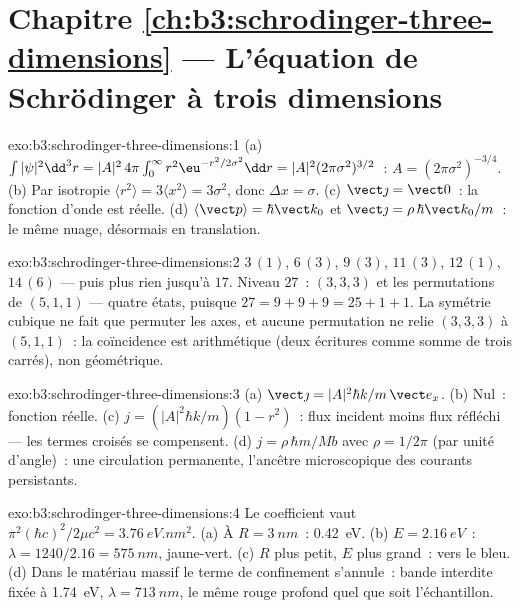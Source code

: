 \section*{Chapitre \ref{ch:b3:schrodinger-three-dimensions} --- L'équation de Schrödinger à trois dimensions}

\begin{solution}{exo:b3:schrodinger-three-dimensions:1}
(a) $\int|\psi|^2\dd^3r = |A|^2\,4\pi\int_0^\infty r^2\eu^{-r^2/2
\sigma^2}\dd r = |A|^2(2\pi\sigma^2)^{3/2}$~: $A = (2\pi\sigma^2)^{
-3/4}$. (b) Par isotropie $\langle r^2\rangle = 3\langle x^2\rangle =
3\sigma^2$, donc $\Delta x = \sigma$. (c) $\vect\jmath = \vect 0$~: la
fonction d'onde est réelle. (d) $\langle\vect p\rangle = \hbar\vect k_0$
et $\vect\jmath = \rho\,\hbar\vect k_0/m$~: le même nuage, désormais en
translation.
\end{solution}

\begin{solution}{exo:b3:schrodinger-three-dimensions:2}
$3\,(1)$, $6\,(3)$, $9\,(3)$, $11\,(3)$, $12\,(1)$, $14\,(6)$ ---
puis plus rien jusqu'à $17$. Niveau $27$~: $(3,3,3)$ et les
permutations de $(5,1,1)$ --- quatre états, puisque $27 = 9+9+9 = 25+1+1$.
La symétrie cubique ne fait que permuter les axes, et aucune
permutation ne relie $(3,3,3)$ à $(5,1,1)$~: la coïncidence est
arithmétique (deux écritures comme somme de trois carrés), non
géométrique.
\end{solution}

\begin{solution}{exo:b3:schrodinger-three-dimensions:3}
(a) $\vect\jmath = |A|^2\hbar k/m\,\vect e_x$. (b) Nul~: fonction
réelle. (c) $j = (|A|^2\hbar k/m)(1 - r^2)$~: flux incident moins flux
réfléchi --- les termes croisés se compensent. (d) $j = \rho\,\hbar
m/Mb$ avec $\rho = 1/2\pi$ (par unité d'angle)~: une circulation
permanente, l'ancêtre microscopique des courants persistants.
\end{solution}

\begin{solution}{exo:b3:schrodinger-three-dimensions:4}
Le coefficient vaut $\pi^2(\hbar c)^2/2\mu c^2 = \qty{3.76}{eV.nm^2}$.
(a) À $R = \qty{3}{nm}$~: \qty{0.42}{eV}. (b) $E = \qty{2.16}{eV}$~:
$\lambda = 1240/2.16 = \qty{575}{nm}$, jaune-vert. (c) $R$ plus petit,
$E$ plus grand~: vers le bleu. (d) Dans le matériau massif le terme de
confinement s'annule~: bande interdite fixée à \qty{1.74}{eV},
$\lambda = \qty{713}{nm}$, le même rouge profond quel que soit
l'échantillon.
\end{solution}

